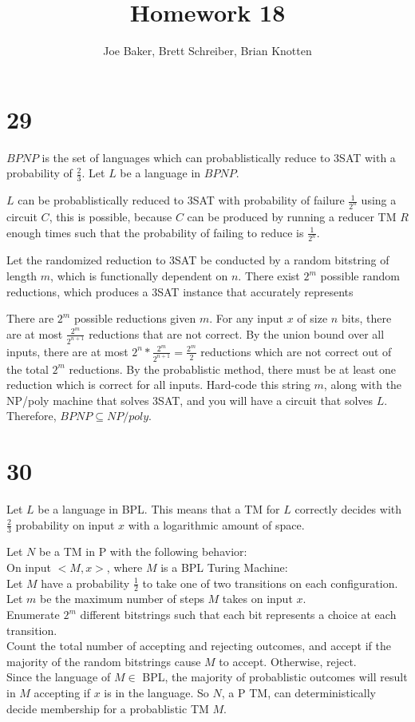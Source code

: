 \documentclass[letterpaper,notitlepage,twoside]{article}
\begin{document}
\title{Homework 18}
\author{Joe Baker, Brett Schreiber, Brian Knotten}
\maketitle

\section*{29}
$BP NP$ is the set of languages which can probablistically reduce to 3SAT with a probability of $\frac{2}{3}$.
Let $L$ be a language in $BP NP$.

$L$ can be probablistically reduced to 3SAT with probability of failure $\frac{1}{2^n}$ using a circuit $C$, this is possible, because $C$ can be produced by running a reducer TM $R$ enough times such that the probability of failing to reduce is $\frac{1}{2^n}$.

Let the randomized reduction to 3SAT be conducted by a random bitstring of length $m$, which is functionally dependent on $n$. There exist $2^m$ possible random reductions, which produces a 3SAT instance that accurately represents

There are $2^m$ possible reductions given $m$. For any input $x$ of size $n$ bits, there are at most $\frac{2^m}{2^{n + 1}}$ reductions that are not correct. By the union bound over all inputs, there are at most ${2^n} * \frac{2^m}{2^{n + 1}} = \frac{2^m}{2}$ reductions which are not correct out of the total $2^m$ reductions. By the probablistic method, there must be at least one reduction which is correct for all inputs. Hard-code this string $m$, along with the NP/poly machine that solves 3SAT, and you will have a circuit that solves $L$. Therefore, $BP NP \subseteq NP/poly$.
\section*{30}
Let $L$ be a language in BPL. This means that a TM for $L$ correctly decides with $\frac{2}{3}$ probability on input $x$ with a logarithmic amount of space.

Let $N$ be a TM in P with the following behavior: \\
On input $<M, x>$, where $M$ is a BPL Turing Machine: \\
Let $M$ have a probability $\frac{1}{2}$ to take one of two transitions on each configuration. \\
Let $m$ be the maximum number of steps $M$ takes on input $x$. \\
Enumerate $2^m$ different bitstrings such that each bit represents a choice at each transition. \\
Count the total number of accepting and rejecting outcomes, and accept if the majority of the random bitstrings cause $M$ to accept. Otherwise, reject. \\

Since the language of $M \in$ BPL, the majority of probablistic outcomes will result in $M$ accepting if $x$ is in the language. So $N$, a P TM, can deterministically decide membership for a probablistic TM $M$.
\end{document}

